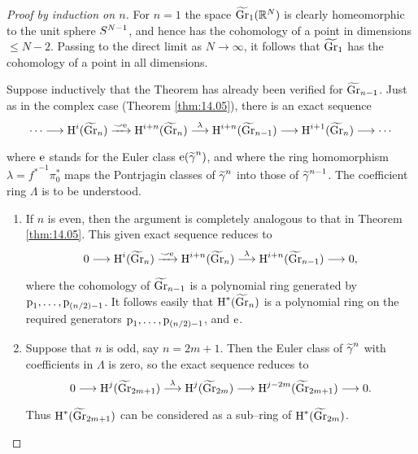 \documentclass[../main]{subfiles}
\begin{document}
\begin{proof}[Proof by induction on $n$]
For $n = 1$ the space ${\xtilde \grassmannian}_1({\mathbb R}^N)$ is clearly homeomorphic to the unit sphere $S^{N - 1}$, and hence has the cohomology of a point in dimensions $\le N - 2$. Passing to the direct limit as $N \to \infty$, it follows that ${\xtilde \grassmannian}_1$ has the cohomology of a point in all dimensions.

Suppose inductively that the Theorem has already been verified for ${\xtilde \grassmannian}_{n - 1}$. Just as in the complex case (Theorem \ref{thm:14.05}), there is an exact sequence \[\cdots \varrightarrow{} \homology^i({\xtilde \grassmannian}_n) \varrightarrow{\smile \eulerclass} \homology^{i + n}({\xtilde \grassmannian}_n) \varrightarrow{\lambda} \homology^{i + n}({\xtilde \grassmannian}_{n - 1}) \varrightarrow{} \homology^{i + 1}({\xtilde \grassmannian}_n) \varrightarrow{} \cdots\] where $\operatorname{e}$ stands for the Euler class $\eulerclass({\xtilde \gamma}^n)$, and where the ring homomorphism $\lambda = {f^\ast}^{-1} \pi_0^\ast$ maps the Pontrjagin classes of ${\xtilde \gamma}^n$ into those of ${\xtilde \gamma}^{n - 1}$. The coefficient ring $\Lambda$ is to be understood. 
\begin{enumerate}[label = Case \arabic*.]
    \item If $n$ is even, then the argument is completely analogous to that in Theorem \ref{thm:14.05}. This given exact sequence reduces to \[0 \varrightarrow{} \homology^i({\xtilde \grassmannian}_n) \varrightarrow{\smile \eulerclass} \homology^{i + n}({\xtilde \grassmannian}_n) \varrightarrow{\lambda} \homology^{i + n}({\xtilde \grassmannian}_{n - 1}) \varrightarrow{} 0,\] where the cohomology of ${\xtilde \grassmannian}_{n - 1}$ is a polynomial ring generated by $\operatorname{p}_1, \ldots, \operatorname{p}_{(n/2) - 1}$. It follows easily that $\homology^\ast({\xtilde \grassmannian}_n)$ is a polynomial ring on the required generators $\operatorname{p}_1, \ldots, \operatorname{p}_{(n/2) - 1}$, and $\operatorname{e}$. 
    
    \item Suppose that $n$ is odd, say $n = 2 m + 1$. Then the Euler class of ${\xtilde \gamma}^n$ with coefficients in $\Lambda$ is zero, so the exact sequence reduces to \[0 \varrightarrow{} \homology^j({\xtilde \grassmannian}_{2m + 1}) \varrightarrow{\lambda} \homology^j({\xtilde \grassmannian}_{2m}) \varrightarrow{} \homology^{j - 2m}({\xtilde \grassmannian}_{2m + 1}) \varrightarrow{} 0.\] Thus $\homology^\ast({\xtilde \grassmannian}_{2m + 1})$ can be considered as a sub--ring of $\homology^\ast({\xtilde \grassmannian}_{2m})$. 
    

\end{enumerate}
\end{proof}
\end{document}
